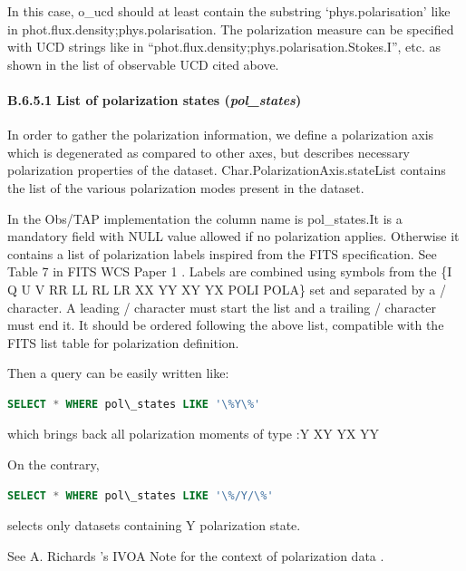 \documentclass[11pt,a4paper]{ivoa}
\begin{document}
In this case, o\_ucd should at least contain the substring `phys.polarisation' like in
{\textquotedbl}phot.flux.density;phys.polarisation{\textquotedbl}. The polarization measure can be specified with UCD
strings like in ``phot.flux.density;phys.polarisation.Stokes.I'', etc. as shown in the list of observable UCD cited
above.

\paragraph{B.6.5.1 List of polarization states (\emph{pol\_states})}
In order to gather the polarization information, we define a polarization axis which is degenerated as compared to other
axes, but describes necessary polarization properties of the dataset. Char.PolarizationAxis.stateList contains the list
of the various polarization modes present in the dataset.

In the Obs/TAP implementation the column name is pol\_states.It is a mandatory field with NULL value allowed if no
polarization applies. Otherwise it contains a list of polarization labels inspired from the FITS specification. See
Table 7 in FITS WCS Paper 1 \citep{2002A&A...395.1061G} . Labels are combined using symbols from the \{I Q U V RR LL RL LR
XX YY XY YX POLI POLA\} set and separated by a / character. A leading / character must start the list and a trailing /
character must end it. It should be ordered following the above list, compatible with the FITS list table for
polarization definition.

Then a query can be easily written like:

\begin{lstlisting}[language=SQL,flexiblecolumns=true]
SELECT * WHERE pol\_states LIKE '\%Y\%'
\end{lstlisting}

which brings back all polarization moments of type :Y XY YX YY

On the contrary,

\begin{lstlisting}[language=SQL,flexiblecolumns=true]
SELECT * WHERE pol\_states LIKE '\%/Y/\%'
\end{lstlisting}

selects only datasets containing Y polarization state.

See A. Richards 's IVOA Note \citep{IVOANote:Polarisation} for the context of polarization data .
\end{document}
